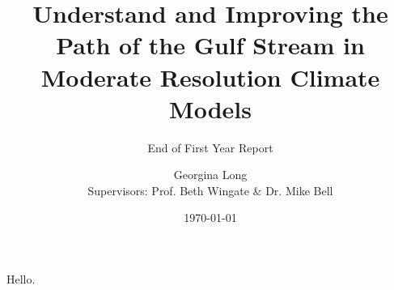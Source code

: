 \documentclass[a4paper,11pt]{article}
\title{Understand and Improving the Path of the Gulf Stream in Moderate Resolution Climate Models}
\subtitle{End of First Year Report}
\author{Georgina Long \\ Supervisors: Prof. Beth Wingate \& Dr. Mike Bell}
\date{\mydate\today}
\begin{document}
\maketitle
Hello.




















\end{document}
